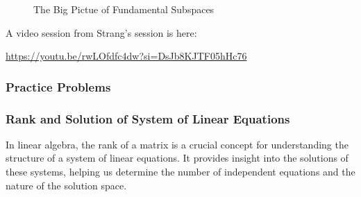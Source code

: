 \documentclass[
  letterpaper,
  DIV=11,
  numbers=noendperiod]{scrreprt}
\theoremstyle{plain}
\theoremstyle{definition}
\theoremstyle{remark}
\begin{document}
\begin{figure}


\caption{\label{fig-big-pic}The Big Pictue of Fundamental Subspaces}

\end{figure}%

A video session from Strang's session is here:

\url{https://youtu.be/rwLOfdfc4dw?si=DsJb8KJTF05hHc76}

\subsubsection{Practice Problems}\label{practice-problems-5}

\subsubsection{Rank and Solution of System of Linear
Equations}\label{rank-and-solution-of-system-of-linear-equations}

In linear algebra, the rank of a matrix is a crucial concept for
understanding the structure of a system of linear equations. It provides
insight into the solutions of these systems, helping us determine the
number of independent equations and the nature of the solution space.
\end{document}
